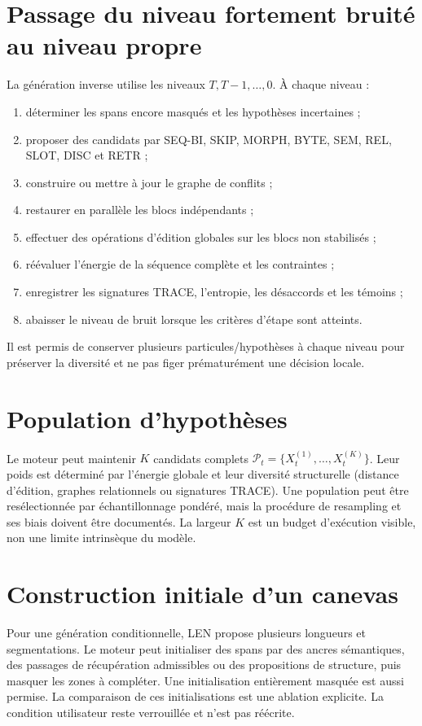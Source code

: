 \documentclass[11pt,a4paper,oneside]{report}
\begin{document}
\section{Passage du niveau fortement bruité au niveau propre}
La génération inverse utilise les niveaux $T,T-1,\ldots,0$. À chaque niveau :
\begin{enumerate}
\item déterminer les spans encore masqués et les hypothèses incertaines ;
\item proposer des candidats par SEQ-BI, SKIP, MORPH, BYTE, SEM, REL, SLOT, DISC et RETR ;
\item construire ou mettre à jour le graphe de conflits ;
\item restaurer en parallèle les blocs indépendants ;
\item effectuer des opérations d'édition globales sur les blocs non stabilisés ;
\item réévaluer l'énergie de la séquence complète et les contraintes ;
\item enregistrer les signatures TRACE, l'entropie, les désaccords et les témoins ;
\item abaisser le niveau de bruit lorsque les critères d'étape sont atteints.
\end{enumerate}
Il est permis de conserver plusieurs particules/hypothèses à chaque niveau pour préserver la diversité et ne pas figer prématurément une décision locale.

\section{Population d'hypothèses}
Le moteur peut maintenir $K$ candidats complets $\mathcal P_t=\{X_t^{(1)},\ldots,X_t^{(K)}\}$. Leur poids est déterminé par l'énergie globale et leur diversité structurelle (distance d'édition, graphes relationnels ou signatures TRACE). Une population peut être resélectionnée par échantillonnage pondéré, mais la procédure de resampling et ses biais doivent être documentés. La largeur $K$ est un budget d'exécution visible, non une limite intrinsèque du modèle.

\section{Construction initiale d'un canevas}
Pour une génération conditionnelle, LEN propose plusieurs longueurs et segmentations. Le moteur peut initialiser des spans par des ancres sémantiques, des passages de récupération admissibles ou des propositions de structure, puis masquer les zones à compléter. Une initialisation entièrement masquée est aussi permise. La comparaison de ces initialisations est une ablation explicite. La condition utilisateur reste verrouillée et n'est pas réécrite.
\end{document}
